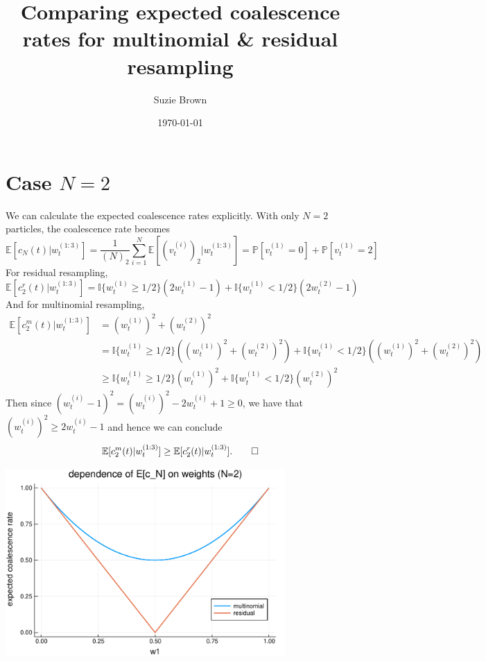 \documentclass[fleqn]{article}
\title{Comparing expected coalescence rates for multinomial \& residual resampling}
\author{Suzie Brown}
\date{\today}
\theoremstyle{definition}
\newcommand{\PR}{\mathbb{P}}
\newcommand{\E}{\mathbb{E}}
\newcommand{\I}[1]{\mathbb{I}\{#1\}}
\newcommand{\vt}[2][t]{v_{#1}^{(#2)}}
\newcommand{\wt}[2][t]{w_{#1}^{(#2)}}
\begin{document}
\maketitle
\thispagestyle{fancy}

\section*{Case $N=2$}
We can calculate the expected coalescence rates explicitly. With only $N=2$ particles, the coalescence rate becomes
\begin{equation*}
\E[c_N(t) |\wt{1:3}] = \frac{1}{(N)_2} \sum_{i=1}^{N} \E\left[ (\vt{i})_2 |\wt{1:3} \right] 
= \PR[\vt{1} = 0] + \PR[\vt{1} = 2]
\end{equation*}
For residual resampling,
\begin{equation*}
\E[c_2^r(t) |\wt{1:3}] = \I{\wt{1} \geq 1/2} (2\wt{1} -1) + \I{\wt{1} < 1/2} (2\wt{2} -1)
\end{equation*}
And for multinomial resampling,
\begin{align*}
\E[c_2^m(t) |\wt{1:3}] &= (\wt{1})^2 + (\wt{2})^2 \\
&= \I{\wt{1} \geq 1/2} ((\wt{1})^2 + (\wt{2})^2) + \I{\wt{1} < 1/2} ((\wt{1})^2 + (\wt{2})^2) \\
&\geq  \I{\wt{1} \geq 1/2} (\wt{1})^2 + \I{\wt{1} < 1/2} (\wt{2})^2
\end{align*}
Then since $(\wt{i} -1)^2 = (\wt{i})^2 -2\wt{i} +1 \geq 0$, we have that $(\wt{i})^2 \geq 2\wt{i} -1$ and hence we can conclude
\begin{equation*}
\E[c_2^m(t) |\wt{1:3}] \geq \E[c_2^r(t) |\wt{1:3}]. \qed
\end{equation*}

\begin{center}
\includegraphics[width=0.8\textwidth]{plots/EcN_mn_res_N2.pdf}
\end{center}
\end{document}
